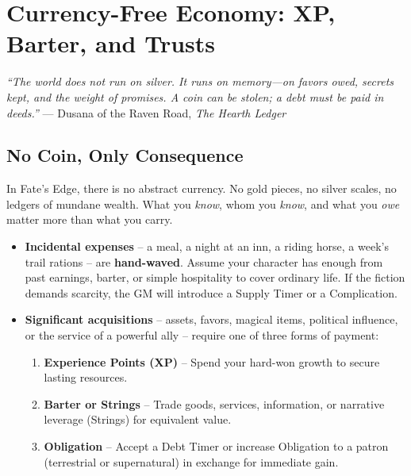 \chapter{Currency-Free Economy: XP, Barter, and Trusts}
\label{ch:currency-free-economy}

\begin{tcolorbox}[colback=blue!5!white,colframe=blue!70!black,title=The Ledger of Memory,breakable]
\emph{``The world does not run on silver. It runs on memory---on favors owed, secrets kept, and the weight of promises. A coin can be stolen; a debt must be paid in deeds.''}
--- Dusana of the Raven Road, \textit{The Hearth Ledger}
\end{tcolorbox}

\section{No Coin, Only Consequence}
\label{sec:no-coin}

In Fate's Edge, there is no abstract currency. No gold pieces, no silver scales, no ledgers of mundane wealth. What you \emph{know}, whom you \emph{know}, and what you \emph{owe} matter more than what you carry.

\begin{itemize}
  \item \textbf{Incidental expenses} -- a meal, a night at an inn, a riding horse, a week's trail rations -- are \textbf{hand-waved}. Assume your character has enough from past earnings, barter, or simple hospitality to cover ordinary life. If the fiction demands scarcity, the GM will introduce a Supply Timer or a Complication.
  \item \textbf{Significant acquisitions} -- assets, favors, magical items, political influence, or the service of a powerful ally -- require one of three forms of payment:
  \begin{enumerate}
    \item \textbf{Experience Points (XP)} -- Spend your hard-won growth to secure lasting resources.
    \item \textbf{Barter or Strings} -- Trade goods, services, information, or narrative leverage (Strings) for equivalent value.
    \item \textbf{Obligation} -- Accept a Debt Timer or increase Obligation to a patron (terrestrial or supernatural) in exchange for immediate gain.
  \end{enumerate}
\end{itemize}

